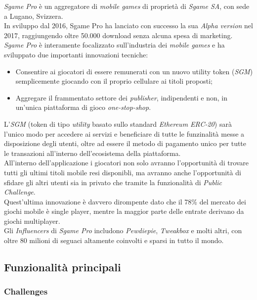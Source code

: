 \documentclass[11pt]{thesistemp}
\begin{document}
\textit{Sgame Pro} è un aggregatore di \textit{mobile games} di proprietà di \textit{Sgame SA}, con sede a Lugano, Svizzera.\\
In sviluppo dal 2016, Sgame Pro ha lanciato con successo la sua \textit{Alpha version} nel 2017, raggiungendo oltre 50.000 download senza alcuna spesa di marketing.\\
\textit{Sgame Pro} è interamente focalizzato sull'industria dei \textit{mobile games} e ha sviluppato due importanti innovazioni tecniche:
\begin{itemize}
	\item Consentire ai giocatori di essere remunerati con un nuovo utility token (\textit{SGM}) semplicemente giocando con il proprio cellulare ai titoli proposti;
	\item Aggregare il frammentato settore dei \textit{publisher}, indipendenti e non, in un'unica piattaforma di gioco \textit{one-stop-shop}.
\end{itemize}
 L'\textit{SGM} (token di tipo \textit{utility} basato sullo standard \textit{Ethereum ERC-20}) sarà l'unico modo per accedere ai servizi e beneficiare di tutte le funzinalità messe a disposizione degli utenti, oltre ad essere il metodo di pagamento unico per tutte le transazioni all'interno dell'ecosistema della piattaforma.\\
All'interno dell'applicazione i giocatori non solo avranno l'opportunità di trovare tutti gli ultimi titoli mobile resi disponibli, ma avranno anche l'opportunità di sfidare gli altri utenti sia in privato che tramite la funzionalità di \textit{Public Challenge}.\\
Quest'ultima innovazione è davvero dirompente dato che il 78\% del mercato dei giochi mobile è single player, mentre la maggior parte delle entrate derivano da giochi multiplayer.\\
Gli \textit{Influencers} di \textit{Sgame Pro} includono \textit{Pewdiepie}, \textit{Tweakbox} e molti altri, con oltre 80 milioni di seguaci altamente coinvolti e sparsi in tutto il mondo.\\ 

\subsection{Funzionalità principali}

\subsubsection{Challenges}
\end{document}
